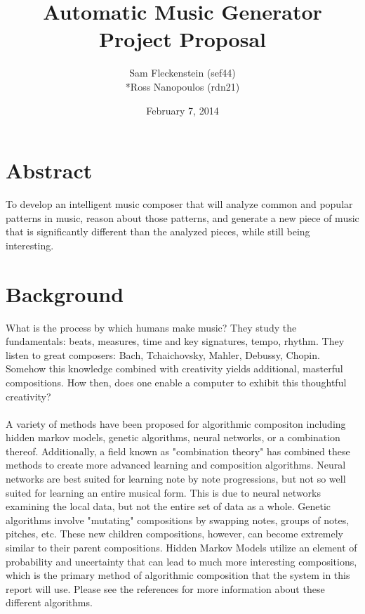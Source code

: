 \documentclass{article}
\begin{document}
\clearpage
{}
\begin{center}
\begin{minipage}{.6\textwidth}

\title{Automatic Music Generator \\ \vspace{2 pt} \Large{Project Proposal}}
\author{Sam Fleckenstein (sef44)\\*Ross Nanopoulos (rdn21)}
\date{February 7, 2014}
\maketitle

\end{minipage}
\end{center}
\clearpage

\tableofcontents
\newpage

\section{Abstract}
To develop an intelligent music composer that will analyze common and popular patterns in music, reason about those patterns, and generate a new piece of music that is significantly different than the analyzed pieces, while still being interesting.

\section{Background}
What is the process by which humans make music? They study the fundamentals: beats, measures, time and key signatures, tempo, rhythm. They listen to great composers: Bach, Tchaichovsky, Mahler, Debussy, Chopin. Somehow this knowledge combined with creativity yields additional, masterful compositions. How then, does one enable a computer to exhibit this thoughtful creativity?\\
\\
A variety of methods have been proposed for algorithmic compositon including hidden markov models, genetic algorithms, neural networks, or a combination thereof. Additionally, a field known as "combination theory" has combined these methods to create more advanced learning and composition algorithms. Neural networks are best suited for learning note by note progressions, but not so well suited for learning an entire musical form. This is due to neural networks examining the local data, but not the entire set of data as a whole. Genetic algorithms involve "mutating" compositions by swapping notes, groups of notes, pitches, etc. These new children compositions, however, can become extremely similar to their parent compositions. Hidden Markov Models utilize an element of probability and uncertainty that can lead to much more interesting compositions, which is the primary method of algorithmic composition that the system in this report will use. Please see the references for more information about these different algorithms.
\end{document}
